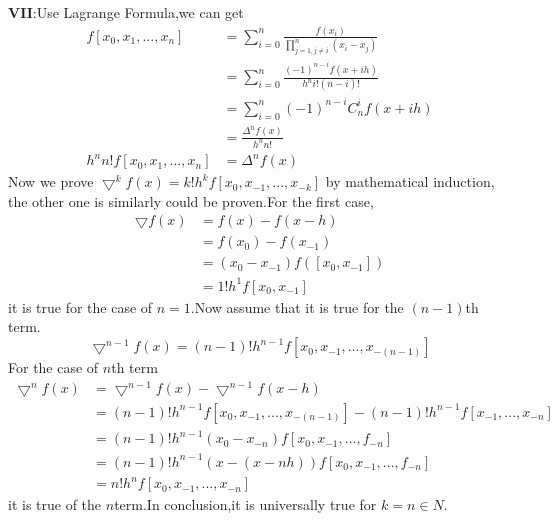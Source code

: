 \documentclass{ctexart}
\begin{document}
\textbf{VII}:Use Lagrange Formula,we can get
\begin{align*}
    f[x_0,x_1,...,x_n]&=\sum_{i=0}^{n} \frac{f(x_i)}{\prod_{j=1,j \neq i}^{n}(x_i-x_j)}\\
    &=\sum_{i=0}^{n}\frac{(-1)^{n-i}f(x+ih)}{h^ni!(n-i)!}\\
    &=\sum_{i=0}^{n}(-1)^{n-i}C_n^if(x+ih)\\
    &=\frac{\Delta ^n f(x)}{h^nn!}\\
    h^nn!f[x_0,x_1,...,x_n]&=\Delta^nf(x)
\end{align*}
Now we prove $\bigtriangledown ^kf(x)=k!h^kf[x_0,x_{-1},...,x_{-k}]$ by mathematical induction, the other one is similarly could be proven.For the first case,
\begin{align*}
    \bigtriangledown f(x)&=f(x)-f(x-h)\\
    &=f(x_0)-f(x_{-1})\\
    &=(x_0-x_{-1})f([x_0,x_{-1}])\\
    &=1!h^1f[x_0,x_{-1}]
\end{align*}
it is true for the case of $n=1$.Now assume that it is true for the $(n-1)$th term.
$$\bigtriangledown ^{n-1}f(x)=(n-1)!h^{n-1}f[x_0,x_{-1},...,x_{-(n-1)}]$$
For the case of $n$th term
\begin{align*}
    \bigtriangledown ^n f(x)&=\bigtriangledown ^{n-1}f(x)-\bigtriangledown ^{n-1} f(x-h)\\
    &=(n-1)!h^{n-1}f[x_0,x_{-1},...,x_{-(n-1)}]-(n-1)!h^{n-1}f[x_{-1},...,x_{-n}]\\
    &=(n-1)!h^{n-1}(x_0-x_{-n})f[x_0,x_{-1},...,f_{-n}]\\
    &=(n-1)!h^{n-1}(x-(x-nh))f[x_0,x_{-1},...,f_{-n}]\\
    &=n!h^nf[x_0,x_{-1},...,x_{-n}]
\end{align*}
it is true of the $n$term.In conclusion,it is universally true for $k=n \in N$.\\
\end{document}
